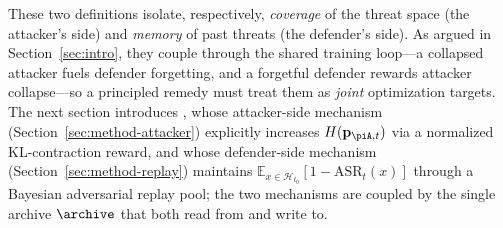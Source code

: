 These two definitions isolate, respectively, \emph{coverage} of the threat space (the attacker's side) and \emph{memory} of past threats (the defender's side). As argued in Section~\ref{sec:intro}, they couple through the shared training loop---a collapsed attacker fuels defender forgetting, and a forgetful defender rewards attacker collapse---so a principled remedy must treat them as \emph{joint} optimization targets. The next section introduces \method, whose attacker-side mechanism (Section~\ref{sec:method-attacker}) explicitly increases $H(\mathbf{p}_{\piA,t})$ via a normalized KL-contraction reward, and whose defender-side mechanism (Section~\ref{sec:method-replay}) maintains $\mathbb{E}_{x\in\mathcal{H}_{t_0}}[1-\mathrm{ASR}_t(x)]$ through a Bayesian adversarial replay pool; the two mechanisms are coupled by the single archive $\archive$ that both read from and write to.
